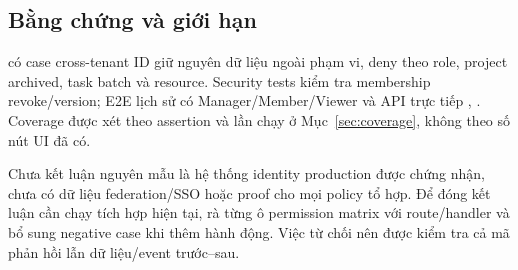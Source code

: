 \subsection{Bằng chứng và giới hạn}
 có case cross-tenant ID giữ nguyên dữ liệu ngoài phạm vi, deny theo role, project archived, task batch và resource. Security tests kiểm tra membership revoke\slash version; E2E lịch sử có Manager\slash Member\slash Viewer và API trực tiếp , . Coverage được xét theo assertion và lần chạy ở Mục~\ref{sec:coverage}, không theo số nút UI đã có.

Chưa kết luận nguyên mẫu là hệ thống identity production được chứng nhận, chưa có dữ liệu federation\slash SSO hoặc proof cho mọi policy tổ hợp. Để đóng kết luận cần chạy tích hợp hiện tại, rà từng ô permission matrix với route\slash handler và bổ sung negative case khi thêm hành động. Việc từ chối nên được kiểm tra cả mã phản hồi lẫn dữ liệu\slash event trước--sau.
